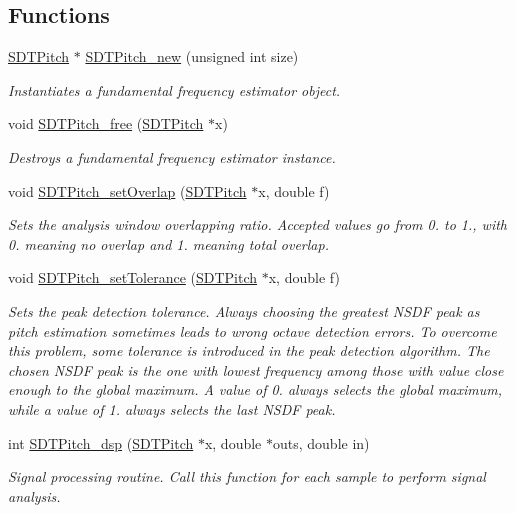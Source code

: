 \subsection*{Functions}
\begin{DoxyCompactItemize}
\item 
\hyperlink{group__pitch_ga93a04dd02784981e8efabae71a248942}{S\+D\+T\+Pitch} $\ast$ \hyperlink{group__pitch_ga14f1ce31f420c7d3467967c1ada751ab}{S\+D\+T\+Pitch\+\_\+new} (unsigned int size)
\begin{DoxyCompactList}\small\item\em Instantiates a fundamental frequency estimator object. \end{DoxyCompactList}\item 
void \hyperlink{group__pitch_ga2389738427ae0e00c78cccb293683c18}{S\+D\+T\+Pitch\+\_\+free} (\hyperlink{group__pitch_ga93a04dd02784981e8efabae71a248942}{S\+D\+T\+Pitch} $\ast$x)
\begin{DoxyCompactList}\small\item\em Destroys a fundamental frequency estimator instance. \end{DoxyCompactList}\item 
void \hyperlink{group__pitch_ga09aca4d2a376f801a631b5702af0dbe3}{S\+D\+T\+Pitch\+\_\+set\+Overlap} (\hyperlink{group__pitch_ga93a04dd02784981e8efabae71a248942}{S\+D\+T\+Pitch} $\ast$x, double f)
\begin{DoxyCompactList}\small\item\em Sets the analysis window overlapping ratio. Accepted values go from 0. to 1., with 0. meaning no overlap and 1. meaning total overlap. \end{DoxyCompactList}\item 
void \hyperlink{group__pitch_ga33cbcd21ce755f3cfc79ad0131ac7e02}{S\+D\+T\+Pitch\+\_\+set\+Tolerance} (\hyperlink{group__pitch_ga93a04dd02784981e8efabae71a248942}{S\+D\+T\+Pitch} $\ast$x, double f)
\begin{DoxyCompactList}\small\item\em Sets the peak detection tolerance. Always choosing the greatest N\+S\+D\+F peak as pitch estimation sometimes leads to wrong octave detection errors. To overcome this problem, some tolerance is introduced in the peak detection algorithm. The chosen N\+S\+D\+F peak is the one with lowest frequency among those with value close enough to the global maximum. A value of 0. always selects the global maximum, while a value of 1. always selects the last N\+S\+D\+F peak. \end{DoxyCompactList}\item 
int \hyperlink{group__pitch_gacf5aaf510204ed203896e00aa2e9022d}{S\+D\+T\+Pitch\+\_\+dsp} (\hyperlink{group__pitch_ga93a04dd02784981e8efabae71a248942}{S\+D\+T\+Pitch} $\ast$x, double $\ast$outs, double in)
\begin{DoxyCompactList}\small\item\em Signal processing routine. Call this function for each sample to perform signal analysis. \end{DoxyCompactList}\end{DoxyCompactItemize}


